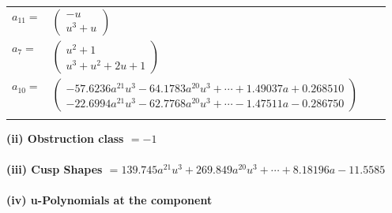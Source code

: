 \documentclass[1p]{elsarticle_modified}
\theoremstyle{definition}
\begin{document}
\begin{tabular}{m{7pt} m{180pt} m{7pt} m{180pt} }
\flushright $a_{11}=$&$\begin{pmatrix}- u\\u^3+u\end{pmatrix}$ \\
\flushright $a_{7}=$&$\begin{pmatrix}u^2+1\\u^3+u^2+2 u+1\end{pmatrix}$ \\
\flushright $a_{10}=$&$\begin{pmatrix}-57.6236 a^{21} u^{3}-64.1783 a^{20} u^{3}+\cdots+1.49037 a+0.268510\\-22.6994 a^{21} u^{3}-62.7768 a^{20} u^{3}+\cdots-1.47511 a-0.286750\end{pmatrix}$\\&\end{tabular}
\flushleft \textbf{(ii) Obstruction class $= -1$}\\~\\
\flushleft \textbf{(iii) Cusp Shapes $= 139.745 a^{21} u^{3}+269.849 a^{20} u^{3}+\cdots+8.18196 a-11.5585$}\\~\\
\newpage\renewcommand{\arraystretch}{1}
\flushleft \textbf{(iv) u-Polynomials at the component}\newline \\
\end{document}
